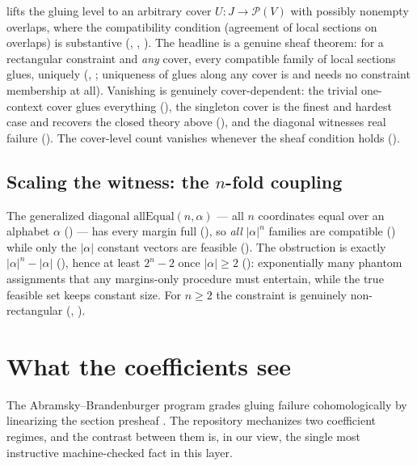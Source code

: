 \documentclass[11pt]{article}
\begin{document}
 lifts the gluing level to an arbitrary cover $U
: J \to \mathcal P(V)$ with possibly nonempty overlaps, where the
compatibility condition (agreement of local sections on overlaps) is
substantive (, ,
).  The headline is a genuine sheaf theorem:
for a rectangular constraint and \emph{any} cover, every compatible
family of local sections glues, uniquely
(,
; uniqueness of glues along
any cover is  and needs no constraint
membership at all).  Vanishing is genuinely cover-dependent: the
trivial one-context cover glues everything
(), the singleton cover is the finest
and hardest case and recovers the closed theory above
(), and the diagonal witnesses
real failure ().  The
cover-level count  vanishes whenever the
sheaf condition holds ().

\subsection{Scaling the witness: the $n$-fold coupling}

The generalized diagonal $\mathrm{allEqual}(n, \alpha)$ --- all $n$
coordinates equal over an alphabet $\alpha$ () --- has
every margin full (), so \emph{all}
$|\alpha|^n$ families are compatible
() while only the $|\alpha|$
constant vectors are feasible ().  The
obstruction is exactly $|\alpha|^n - |\alpha|$
(), hence at least $2^n - 2$ once
$|\alpha| \ge 2$ (): exponentially
many phantom assignments that any margins-only procedure must
entertain, while the true feasible set keeps constant size.  For $n
\ge 2$ the constraint is genuinely non-rectangular
(,
).

\section{What the coefficients see}
\label{sec:coefficients}

The Abramsky--Brandenburger program grades gluing failure
cohomologically by linearizing the section presheaf
\citep{abramsky2011sheaf,abramsky2012cohomology}.  The repository
mechanizes two coefficient regimes, and the contrast between them is,
in our view, the single most instructive machine-checked fact in this
layer.
\end{document}
